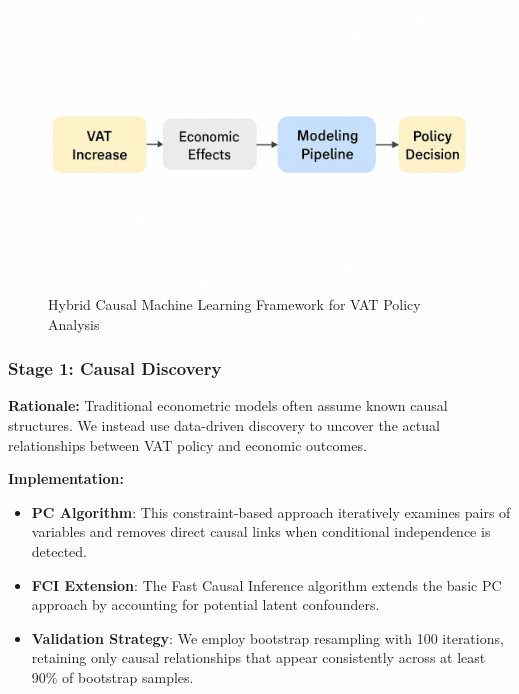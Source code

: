 \begin{figure}[htbp]
    \centering
    \includegraphics[width=\textwidth]{images/modelplan.png}
    \caption{Hybrid Causal Machine Learning Framework for VAT Policy Analysis}
    \label{fig:modelplan}
\end{figure}



\subsubsection{Stage 1: Causal Discovery}
\textbf{Rationale:} Traditional econometric models often assume known causal structures. We instead use data-driven discovery to uncover the actual relationships between VAT policy and economic outcomes.

\textbf{Implementation:}
\begin{itemize}
    \item \textbf{PC Algorithm}: This constraint-based approach iteratively examines pairs of variables and removes direct causal links when conditional independence is detected.
    \item \textbf{FCI Extension}: The Fast Causal Inference algorithm extends the basic PC approach by accounting for potential latent confounders.
    \item \textbf{Validation Strategy}: We employ bootstrap resampling with 100 iterations, retaining only causal relationships that appear consistently across at least 90\% of bootstrap samples.
\end{itemize}

